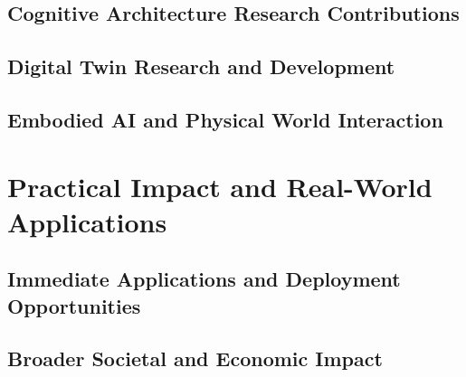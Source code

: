 \subsection{Cognitive Architecture Research Contributions}

\subsection{Digital Twin Research and Development}

\subsection{Embodied AI and Physical World Interaction}

\section{Practical Impact and Real-World Applications}

\subsection{Immediate Applications and Deployment Opportunities}

\subsection{Broader Societal and Economic Impact}

